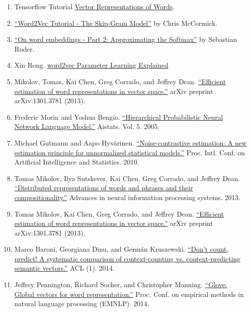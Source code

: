 \begin{enumerate}
    \item Tensorflow Tutorial \href{https://www.tensorflow.org/tutorials/word2vec}{Vector Representations of Words}.
    \item \href{http://mccormickml.com/2016/04/19/word2vec-tutorial-the-skip-gram-model/}{``Word2Vec Tutorial - The Skip-Gram Model''} by Chris McCormick.
    \item \href{http://ruder.io/word-embeddings-softmax/}{``On word embeddings - Part 2: Approximating the Softmax''} by Sebastian Ruder.
    \item Xin Rong. \href{https://arxiv.org/pdf/1411.2738.pdf}{word2vec Parameter Learning Explained}
    \item Mikolov, Tomas, Kai Chen, Greg Corrado, and Jeffrey Dean. \href{https://arxiv.org/pdf/1301.3781.pdf}{``Efficient estimation of word representations in vector space.''} arXiv preprint arXiv:1301.3781 (2013).
    \item Frederic Morin and Yoshua Bengio. \href{https://www.iro.umontreal.ca/~lisa/pointeurs/hierarchical-nnlm-aistats05.pdf}{``Hierarchical Probabilistic Neural Network Language Model.''} Aistats. Vol. 5. 2005.
    \item Michael Gutmann and Aapo Hyvärinen. \href{http://proceedings.mlr.press/v9/gutmann10a/gutmann10a.pdf}{``Noise-contrastive estimation: A new estimation principle for unnormalized statistical models.''} Proc. Intl. Conf. on Artificial Intelligence and Statistics. 2010.
    \item Tomas Mikolov, Ilya Sutskever, Kai Chen, Greg Corrado, and Jeffrey Dean. \href{https://papers.nips.cc/paper/5021-distributed-representations-of-words-and-phrases-and-their-compositionality.pdf}{``Distributed representations of words and phrases and their compositionality.''} Advances in neural information processing systems. 2013.
    \item Tomas Mikolov, Kai Chen, Greg Corrado, and Jeffrey Dean. \href{https://arxiv.org/pdf/1301.3781.pdf}{``Efficient estimation of word representations in vector space.''} arXiv preprint arXiv:1301.3781 (2013).
    \item Marco Baroni, Georgiana Dinu, and Germán Kruszewski. \href{http://anthology.aclweb.org/P/P14/P14-1023.pdf}{``Don't count, predict! A systematic comparison of context-counting vs. context-predicting semantic vectors.''} ACL (1). 2014.
    \item Jeffrey Pennington, Richard Socher, and Christopher Manning. \href{http://www.aclweb.org/anthology/D14-1162}{``Glove: Global vectors for word representation.''} Proc. Conf. on empirical methods in natural language processing (EMNLP). 2014.
\end{enumerate}

